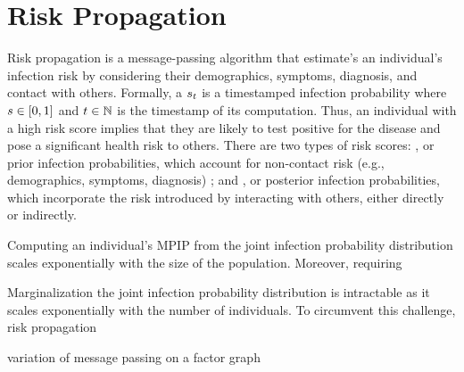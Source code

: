 \chapter{Risk Propagation}

\NewDocumentCommand{\eventSpace}{}{\Omega}
\NewDocumentCommand{\event}{}{\omega}


Risk propagation is a message-passing algorithm that estimate's an individual's infection risk by considering their demographics, symptoms, diagnosis, and contact with others. Formally, a  $s_t$ is a timestamped infection probability where $s \in [0, 1]$ and $t \in \mathbb{N}$ is the timestamp of its computation. Thus, an individual with a high risk score implies that they are likely to test positive for the disease and pose a significant health risk to others. There are two types of risk scores: , or prior infection probabilities, which account for non-contact risk (e.g., demographics, symptoms, diagnosis) \cite{Menni2020}; and , or posterior infection probabilities, which incorporate the risk introduced by interacting with others, either directly or indirectly.



Computing an individual's MPIP from the joint infection probability distribution scales exponentially with the size of the population. Moreover, requiring 

Marginalization the joint infection probability distribution is intractable as it scales exponentially with the number of individuals. To circumvent this challenge, risk propagation 

variation of message passing on a factor graph


